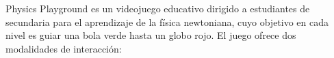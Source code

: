 %
%
%

Physics Playground es un videojuego educativo dirigido a estudiantes de secundaria para el aprendizaje de la física newtoniana, cuyo objetivo en cada nivel es guiar una bola verde hasta un globo rojo. El juego ofrece dos modalidades de interacción:

